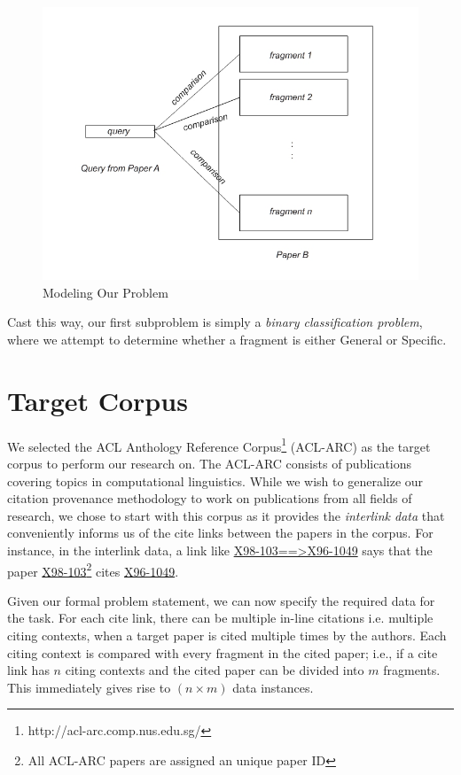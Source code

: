 \begin{figure}[h]
  \centering
  \includegraphics[scale=0.50]{./model}
  \caption{Modeling Our Problem}
  \label{fig:model}
\end{figure}

Cast this way, our first subproblem is simply a \textit{binary classification problem}, where we attempt to determine whether a fragment is either General or Specific.

\section{Target Corpus}
\label{buildingcorpus}
We selected the ACL Anthology Reference Corpus\footnote{http://acl-arc.comp.nus.edu.sg/} (ACL-ARC) as the target corpus to perform our research on. The ACL-ARC consists of publications covering topics in computational linguistics.  While we wish to generalize our citation provenance methodology to work on publications from all fields of research, we chose to start with this corpus as it provides the \textit{interlink data} that conveniently informs us of the cite links between the papers in the corpus. For instance, in the interlink data, a link like \url{X98-103==>X96-1049} says that the paper \url{X98-103}\footnote{All ACL-ARC papers are assigned an unique paper ID} cites \url{X96-1049}.  

Given our formal problem statement, we can now specify the required data for the task. For each cite link, there can be multiple in-line citations i.e. multiple citing contexts, when a target paper is cited multiple times by the authors. Each citing context is compared with every fragment in the cited paper; i.e., if a cite link has $n$ citing contexts and the cited paper can be divided into $m$ fragments.  This immediately gives rise to $(n \times m)$ data instances.

